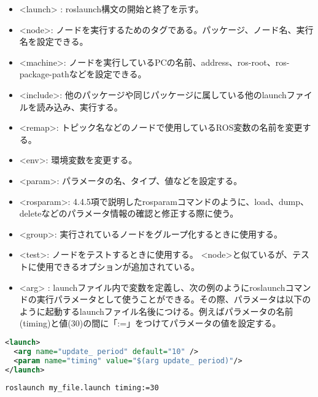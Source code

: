 \vspace{\baselineskip}
\begin{itemize}
\item  <launch> : roslaunch構文の開始と終了を示す。
\item <node>: ノードを実行するためのタグである。パッケージ、ノード名、実行名を設定できる。
\item <machine>: ノードを実行しているPCの名前、address、ros-root、ros-package-pathなどを設定できる。
\item <include>: 他のパッケージや同じパッケージに属している他のlaunchファイルを読み込み、実行する。
\item <remap>: トピック名などのノードで使用しているROS変数の名前を変更する。
\item <env>: 環境変数を変更する。
\item <param>: パラメータの名、タイプ、値などを設定する。
\item <rosparam>: 4.4.5項で説明したrosparamコマンドのように、load、dump、deleteなどのパラメータ情報の確認と修正する際に使う。
\item <group>: 実行されているノードをグループ化するときに使用する。
\item <test>: ノードをテストするときに使用する。 <node>と似ているが、テストに使用できるオプションが追加されている。
\item <arg> : launchファイル内で変数を定義し、次の例のようにroslaunchコマンドの実行パラメータとして使うことができる。その際、パラメータは以下のように起動するlaunchファイル名後につける。例えばパラメータの名前(timing)と値(30)の間に「:=」をつけてパラメータの値を設定する。
\end{itemize}
\vspace{\baselineskip}

\begin{lstlisting}[language=XML]
<launch>
  <arg name="update_ period" default="10" />
  <param name="timing" value="$(arg update_ period)"/>
</launch>
\end{lstlisting}
\vspace{\baselineskip}

\begin{lstlisting}[language=ROS]
roslaunch my_file.launch timing:=30
\end{lstlisting}


